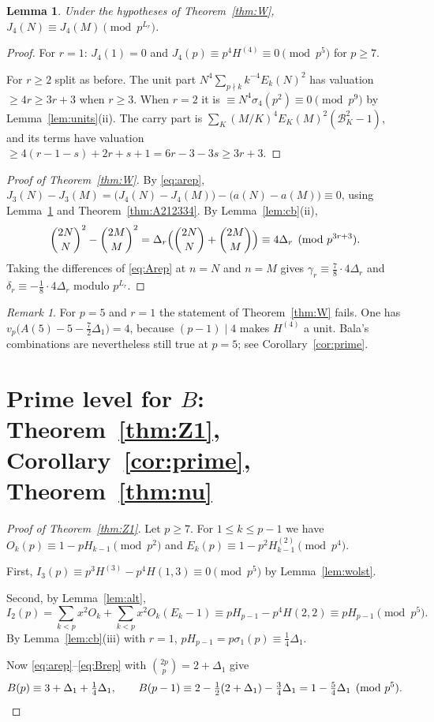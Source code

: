 \documentclass[11pt]{amsart}
\newtheorem{lemma}[theorem]{Lemma}
\theoremstyle{definition}
\theoremstyle{remark}
\newtheorem{remark}[theorem]{Remark}
\newcommand{\vp}{v_p}
\newcommand{\bin}[2]{\binom{#1}{#2}}
\begin{document}
\begin{lemma}\label{lem:J4}
Under the hypotheses of Theorem~\ref{thm:W}, $J_4(N)\equiv J_4(M)\pmod{p^{L_r}}$.
\end{lemma}
\begin{proof}
For $r=1$: $J_4(1)=0$ and $J_4(p)\equiv p^4H^{(4)}\equiv0\pmod{p^5}$ for $p\ge7$.

For $r\ge2$ split as before. The unit part $N^4\sum_{p\nmid k}k^{-4}E_k(N)^2$ has valuation
$\ge4r\ge3r+3$ when $r\ge3$. When $r=2$ it is $\equiv N^4\sigma_4(p^2)\equiv0\pmod{p^{9}}$ by
Lemma~\ref{lem:units}(ii). The carry part is $\sum_K(M/K)^4E_K(M)^2(\mathcal B_K^2-1)$, and its
terms have valuation $\ge 4(r-1-s)+2r+s+1=6r-3-3s\ge3r+3$.
\end{proof}

\begin{proof}[Proof of Theorem~\ref{thm:W}]
By \eqref{eq:arep}, $J_3(N)-J_3(M)=\bigl(J_4(N)-J_4(M)\bigr)-\bigl(a(N)-a(M)\bigr)\equiv0$, using
Lemma~\ref{lem:J4} and Theorem~\ref{thm:A212334}. By Lemma~\ref{lem:cb}(ii),
\[
\bin{2N}N^2-\bin{2M}M^2=\Delta_r\Bigl(\bin{2N}N+\bin{2M}M\Bigr)\equiv4\Delta_r\pmod{p^{3r+3}}.
\]
Taking the differences of \eqref{eq:Arep} at $n=N$ and $n=M$ gives
$\gamma_r\equiv\frac78\cdot4\Delta_r$ and $\delta_r\equiv-\frac18\cdot4\Delta_r$ modulo
$p^{L_r}$.
\end{proof}

\begin{remark}
For $p=5$ and $r=1$ the statement of Theorem~\ref{thm:W} fails. One has
$\vp\bigl(A(5)-5-\tfrac72\Delta_1\bigr)=4$, because $(p-1)\mid4$ makes $H^{(4)}$ a unit.
Bala's combinations are nevertheless still true at $p=5$; see Corollary~\ref{cor:prime}.
\end{remark}

\section{Prime level for \texorpdfstring{$B$}{B}: Theorem~\ref{thm:Z1}, Corollary~\ref{cor:prime}, Theorem~\ref{thm:nu}}

\begin{proof}[Proof of Theorem~\ref{thm:Z1}]
Let $p\ge7$. For $1\le k\le p-1$ we have $O_k(p)\equiv1-pH_{k-1}\pmod{p^2}$ and
$E_k(p)\equiv1-p^2H^{(2)}_{k-1}\pmod{p^4}$.

First, $I_3(p)\equiv p^3H^{(3)}-p^4H(1,3)\equiv0\pmod{p^5}$ by Lemma~\ref{lem:wolst}.

Second, by Lemma~\ref{lem:alt},
\[
I_2(p)=\sum_{k<p}x^2O_k+\sum_{k<p}x^2O_k(E_k-1)
\equiv pH_{p-1}-p^4H(2,2)\equiv pH_{p-1}\pmod{p^5}.
\]
By Lemma~\ref{lem:cb}(iii) with $r=1$, $pH_{p-1}=p\sigma_1(p)\equiv\frac14\Delta_1$.

Now \eqref{eq:arep}--\eqref{eq:Brep} with $\binom{2p}p=2+\Delta_1$ give
\[
B(p)\equiv 3+\Delta_1+\tfrac14\Delta_1,\qquad
B(p-1)\equiv 2-\tfrac12(2+\Delta_1)-\tfrac34\Delta_1=1-\tfrac54\Delta_1\pmod{p^5}.\qedhere
\]
\end{proof}
\end{document}
